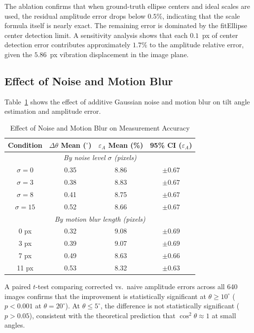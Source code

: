 \documentclass[journal]{IEEEtran}
\begin{document}
The ablation confirms that when ground-truth ellipse centers and ideal scales
are used, the residual amplitude error drops below $0.5\%$, indicating that
the scale formula itself is nearly exact. The remaining error is dominated by
the fitEllipse center detection limit. A sensitivity analysis shows that each
$0.1$~px of center detection error contributes approximately $1.7\%$ to the
amplitude relative error, given the $5.86$~px vibration displacement in the
image plane.

\subsection{Effect of Noise and Motion Blur}

Table~\ref{tab:noise_blur} shows the effect of additive Gaussian noise and
motion blur on tilt angle estimation and amplitude error.

\begin{table}[!t]
\centering
\caption{Effect of Noise and Motion Blur on Measurement Accuracy}
\label{tab:noise_blur}
\begin{tabular}{cccc}
\toprule
Condition & $\Delta\theta$ Mean ($^{\circ}$) & $\varepsilon_A$ Mean (\%) & 95\% CI ($\varepsilon_A$) \\
\midrule
\multicolumn{4}{c}{\textit{By noise level $\sigma$ (pixels)}} \\
$\sigma = 0$  & 0.35 & 8.86 & $\pm 0.67$ \\
$\sigma = 3$  & 0.38 & 8.83 & $\pm 0.67$ \\
$\sigma = 8$  & 0.41 & 8.75 & $\pm 0.67$ \\
$\sigma = 15$ & 0.52 & 8.66 & $\pm 0.67$ \\
\midrule
\multicolumn{4}{c}{\textit{By motion blur length (pixels)}} \\
0  px & 0.32 & 9.08 & $\pm 0.69$ \\
3  px & 0.39 & 9.07 & $\pm 0.69$ \\
7  px & 0.49 & 8.63 & $\pm 0.66$ \\
11 px & 0.53 & 8.32 & $\pm 0.63$ \\
\bottomrule
\end{tabular}
\end{table}

A paired $t$-test comparing corrected vs.\ naive amplitude errors across all
640 images confirms that the improvement is statistically significant at
$\theta \geq 10^{\circ}$ ($p < 0.001$ at $\theta = 20^{\circ}$). At
$\theta \leq 5^{\circ}$, the difference is not statistically significant
($p > 0.05$), consistent with the theoretical prediction that
$\cos^{2}\theta \approx 1$ at small angles.
\end{document}
